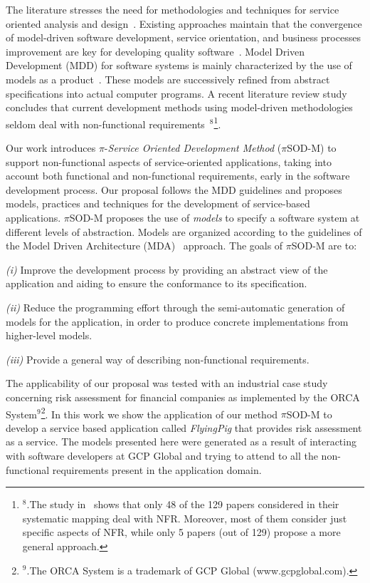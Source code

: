 \documentclass[12pt,twoside]{article}
\theoremstyle{plain}
\theoremstyle{plain}
\newcommand{\pisodm}[0]{$\pi$SOD-M\xspace}
\def\FlyingPig{\textsl{FlyingPig}\xspace}
\begin{document}
\begin{multicols}{2}
The literature stresses the need for meth\-od\-ol\-o\-gies and techniques for service oriented analysis and design~\cite{Papazoglou2007}.
Existing approaches maintain that the convergence of model-driven soft\-ware development, service orientation,   and  busi\-ness processes improvement are key for developing quality software~\cite{watson}.
Model Driven Development (MDD)  for software systems is mainly characterized by the use of models as a product~\cite{Selic03}.
These models are successively refined from abstract specifications into actual computer programs. 
A recent literature review study concludes that current development methods using model-driven methodologies seldom deal with non-functional requirements~\cite{Ameller201542}$^8$\footnote{$^8$.The study in~\cite{Ameller201542} shows that only 48 of the 129 papers considered in their systematic mapping deal with NFR. Moreover, most of them consider just specific aspects of NFR, while only 5 papers (out of 129) propose a more general approach.}.

\bigskip
Our work introduces $\pi$-\textit{Service Oriented Development Method} (\pisodm) to support non-functional aspects of service-oriented applications, taking into account both functional and non-functional requirements, early in the software development process.
Our proposal follows the MDD guidelines and proposes models, practices and techniques for the development of service-based applications.  
\pisodm proposes  the use of \textit{models} to specify a software system at different levels of abstraction.
Models are organized according to the guidelines of the Model Driven Archi\-tec\-ture (MDA)~\cite{miller} approach.
The goals of  \pisodm are to:
\begin{trivlist}
\item \textit{(i)} Improve the development process by providing an abstract view of the application and aiding to ensure the conformance to its specification.
\item \textit{(ii)} Reduce the programming effort through the semi-automatic generation of  models for the application, in order to produce concrete implementations from higher-level models.
\item \textit{(iii)} Provide a general way of describing non-functional requirements.
\end{trivlist}

The applicability of our proposal was tested with an industrial case study concerning risk assessment for financial companies as implemented by the ORCA System$^9$\footnote{$^9$.The ORCA System is a trademark of GCP Global (www.gcpglobal.com).}. In this work we show the application of our method \pisodm to develop a service based application called \FlyingPig that provides risk assessment as a service.
The models presented here were generated as a result of interacting with software developers at GCP Global and trying to attend to all the non-functional requirements present in the application domain.


\end{multicols}
\end{document}
